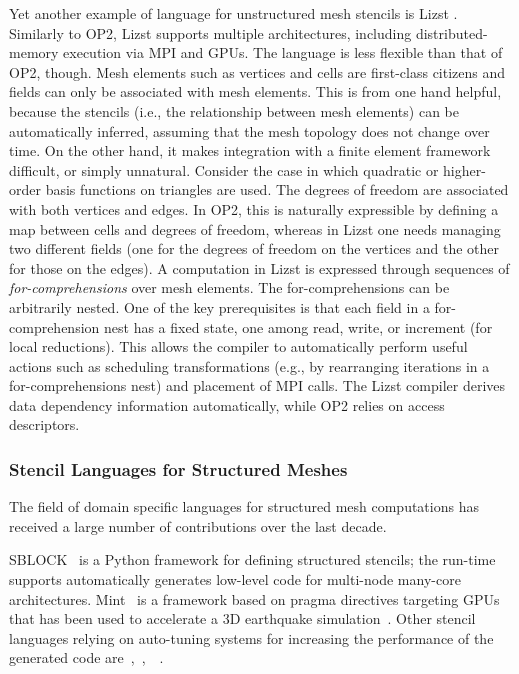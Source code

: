 Yet another example of language for unstructured mesh stencils is Lizst \citep{lizst}. Similarly to OP2, Lizst supports multiple architectures, including distributed-memory execution via MPI and GPUs. The language is less flexible than that of OP2, though. Mesh elements such as vertices and cells are first-class citizens and fields can only be associated with mesh elements. This is from one hand helpful, because the stencils (i.e., the relationship between mesh elements) can be automatically inferred, assuming that the mesh topology does not change over time. On the other hand, it makes integration with a finite element framework difficult, or simply unnatural. Consider the case in which quadratic or higher-order basis functions on triangles are used. The degrees of freedom are associated with both vertices and edges. In OP2, this is naturally expressible by defining a map between cells and degrees of freedom, whereas in Lizst one needs managing two different fields (one for the degrees of freedom on the vertices and the other for those on the edges). A computation in Lizst is expressed through sequences of {\em for-comprehensions} over mesh elements. The for-comprehensions can be arbitrarily nested. One of the key prerequisites is that each field in a for-comprehension nest has a fixed state, one among read, write, or increment (for local reductions). This allows the compiler to automatically perform useful actions such as scheduling transformations (e.g., by rearranging iterations in a for-comprehensions nest) and placement of MPI calls. The Lizst compiler derives data dependency information automatically, while OP2 relies on access descriptors. 

\subsubsection{Stencil Languages for Structured Meshes}
The field of domain specific languages for structured mesh computations has received a large number of contributions over the last decade. 

SBLOCK~\cite{sblock-cite} is a Python framework for defining structured stencils; the run-time supports automatically generates low-level code for multi-node many-core architectures. Mint~\cite{mint-cite} is a framework based on pragma directives targeting GPUs that has been used to accelerate a 3D earthquake simulation~\cite{mint-simulation-cite}. Other stencil languages relying on auto-tuning systems for increasing the performance of the generated code are~\cite{zhang-mueller-cite},~\cite{kamil-cite},~\cite{patus}~\cite{gpu-stencil-automated}.

